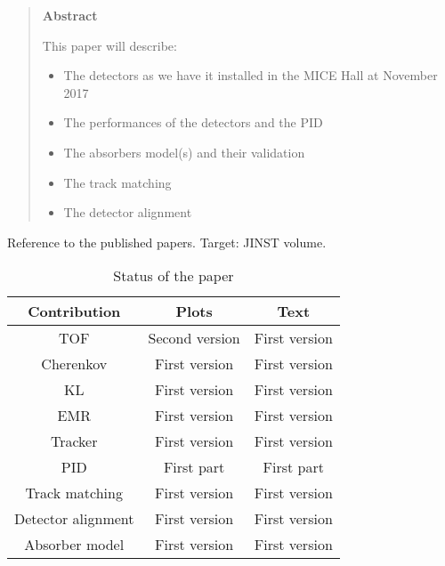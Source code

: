 \begin{quotation}
\begin{center}
\textbf{Abstract}
\end{center}
  \noindent
  This paper will describe:
  \begin{itemize}
    \item The detectors as we have it installed in the MICE Hall at November 2017
    \item The performances of the detectors and the PID
    \item The absorbers model(s) and their validation
    \item The track matching
    \item The detector alignment
  \end{itemize}
\end{quotation}

\noindent

Reference to the published papers.
Target: JINST volume.

\begin{table}[!ht]
  \caption{Status of the paper}
  \label{tab:}

  \begin{center}
    \begin{tabular}{c|c|c}
        \hline
       Contribution         & Plots             & Text\\
       \hline
       TOF                  & Second version    & First version \\
       Cherenkov            & First version     & First version \\
       KL                   & First version     & First version \\
       EMR                  & First version     & First version \\
       Tracker              & First version     & First version \\
       PID                  & First part        & First part \\
       Track matching       & First version     & First version \\
       Detector alignment   & First version     & First version \\
       Absorber model       & First version     & First version \\
       
       \hline
    \end{tabular}
  \end{center}
\end{table}
